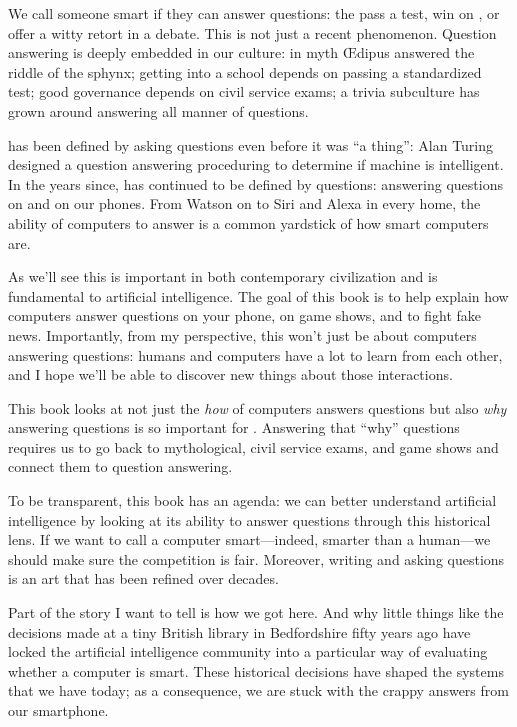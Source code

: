 We call someone smart if they can answer questions: the pass a test, win
on \jeopardyp{}, or offer a witty retort in a debate.
%
This is not just a recent phenomenon.
%
Question answering is deeply embedded in
our culture:
%
in myth \OE{}dipus answered the riddle of the sphynx;
%
getting into a school depends on passing a standardized test;
%
good governance depends on civil service exams;
%
a trivia subculture has grown around answering all manner of questions.

 has been defined by asking questions even before it was ``a
thing'': Alan Turing designed a question answering proceduring to
determine if machine is intelligent.
%
In the years since,  has continued to be defined by questions:
answering questions on \jeopardy{} and on our phones.
%
From  Watson on \jeopardy{} to Siri and Alexa in every home, the ability of
computers to answer is a common yardstick of how smart computers are.

As we’ll see this is important in both contemporary civilization and is
fundamental to artificial intelligence.  The goal of this book is to help
explain how computers answer questions on your phone, on game shows, and to
fight fake news.  Importantly, from my perspective, this won’t just be about
computers answering questions: humans and computers have a lot to learn from
each other, and I hope we’ll be able to discover new things about those
interactions.

This book looks at not just the \emph{how} of computers answers
questions but also \emph{why} answering questions is so important
for .
%
Answering that ``why'' questions requires us to go back to
mythological, civil service exams, and game shows and connect them
to  question answering.

To be transparent, this book has an agenda: we can better understand
artificial intelligence by looking at its ability to answer questions
through this historical lens.
%
If we want to call a computer smart---indeed, smarter than a
human---we should make sure the competition is fair.
%
Moreover, writing and asking questions is an art that has been refined
over decades.

Part of the story I want to tell is how we got here.
%
And why little things like the decisions made at a tiny British
library in Bedfordshire fifty years ago have locked the artificial
intelligence community into a particular way of evaluating whether a
computer is smart.
%
These historical decisions have shaped the systems that we have today;
as a consequence, we are stuck with the crappy answers from our
smartphone.

